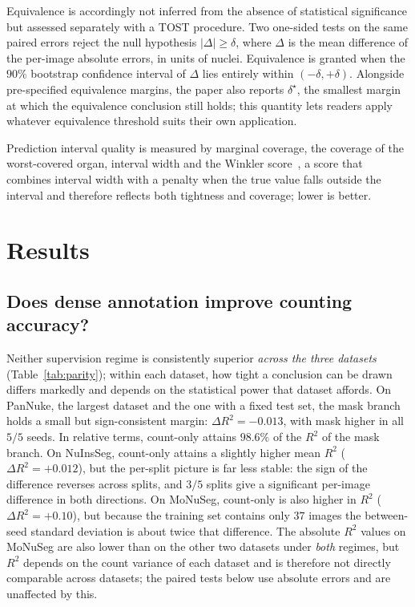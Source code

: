 \documentclass[pdflatex,sn-mathphys-num]{sn-jnl}
\begin{document}
Equivalence is accordingly not inferred from the absence of statistical significance but assessed separately
with a TOST procedure. Two one-sided tests on the same paired errors reject the null hypothesis
$|\Delta| \ge \delta$, where $\Delta$ is the mean difference of the per-image absolute errors, in units of
nuclei. Equivalence is granted when the $90\%$ bootstrap confidence interval of $\Delta$ lies entirely within
$(-\delta, +\delta)$. Alongside pre-specified equivalence margins, the paper also reports $\delta^\star$, the
smallest margin at which the equivalence conclusion still holds; this quantity lets readers apply whatever
equivalence threshold suits their own application.

Prediction interval quality is measured by marginal coverage, the coverage of the worst-covered organ, interval
width and the Winkler score~\cite{winkler}, a score that combines interval width with a penalty when the true
value falls outside the interval and therefore reflects both tightness and coverage; lower is better.

\section{Results}\label{sec:results}

\subsection{Does dense annotation improve counting accuracy?}\label{sec:parity}

Neither supervision regime is consistently superior \emph{across the three datasets}
(Table~\ref{tab:parity}); within each dataset, how tight a conclusion can be drawn differs markedly and depends
on the statistical power that dataset affords. On PanNuke, the largest dataset and the one with a fixed test
set, the mask branch holds a small but sign-consistent margin: $\Delta R^2 = -0.013$, with mask higher in all
$5/5$ seeds. In relative terms, count-only attains $98.6\%$ of the $R^2$ of the mask branch. On NuInsSeg,
count-only attains a slightly higher mean $R^2$ ($\Delta R^2 = +0.012$), but the per-split picture is far less
stable: the sign of the difference reverses across splits, and $3/5$ splits give a significant per-image
difference in both directions. On MoNuSeg, count-only is also higher in $R^2$ ($\Delta R^2 = +0.10$), but
because the training set contains only $37$ images the between-seed standard deviation is about twice that
difference. The absolute $R^2$ values on MoNuSeg are also lower than on the other two datasets under
\emph{both} regimes, but $R^2$ depends on the count variance of each dataset and is therefore not directly
comparable across datasets; the paired tests below use absolute errors and are unaffected by this.
\end{document}

